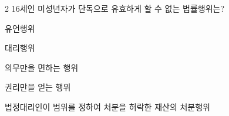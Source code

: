 \begin{question}{2}
16세인 미성년자가 단독으로 유효하게 할 수 없는 법률행위는?
\begin{choices}
  \item 유언행위
  \item 대리행위
  \item 의무만을 면하는 행위
  \item 권리만을 얻는 행위
  \item 법정대리인이 범위를 정하여 처분을 허락한 재산의 처분행위
\end{choices}
\end{question}
